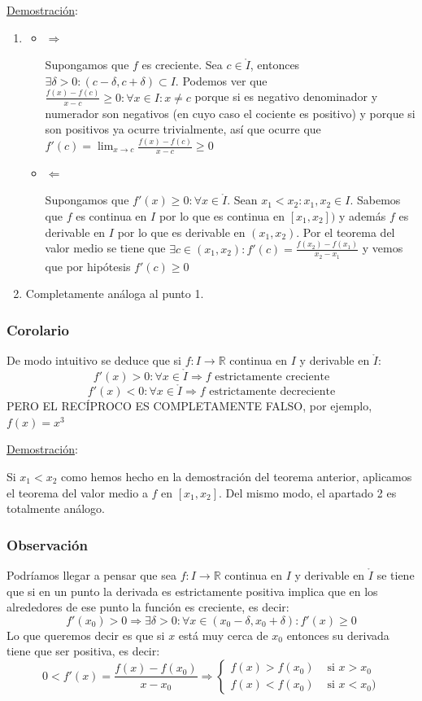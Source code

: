 \documentclass[10pt,a4paper,openright]{book}
\begin{document}
\underline{Demostración}:
\begin{enumerate}
\item
	\begin{itemize}
	\item $\Rightarrow$
	
	Supongamos que $f$ es creciente. Sea $c\in \mathring{I}$, entonces $\exists \delta>0: (c-\delta, c+\delta)\subset I$. Podemos ver que $\frac{f(x)-f(c)}{x-c}\geq 0: \forall x\in I: x\neq c$ porque si es negativo denominador y numerador son negativos (en cuyo caso el cociente es positivo) y porque si son positivos ya ocurre trivialmente, así que ocurre que $f'(c)=\lim_{x\rightarrow c} \frac{f(x)-f(c)}{x-c} \geq 0$
	
	\item $\Leftarrow$
	
	Supongamos que $f'(x)\geq 0: \forall x \in \mathring{I}$. Sean $x_1<x_2: x_1,x_2\in I$. Sabemos que $f$ es continua en $I$ por lo que es continua en $[x_1,x_2])$ y además $f$ es derivable en $I$ por lo que es derivable en $(x_1,x_2)$. Por el teorema del valor medio se tiene que $\exists c\in (x_1,x_2): f'(c)=\frac{f(x_2)-f(x_1)}{x_2-x_1}$ y vemos que por hipótesis $f'(c)\geq 0$	
	\end{itemize}
	
\item Completamente análoga al punto 1.
\end{enumerate}

\subsubsection*{Corolario}
De modo intuitivo se deduce que si $f:I\rightarrow\mathbb R$ continua en $I$ y derivable en $\mathring{I}$:
$$f'(x)>0: \forall x\in \mathring{I}\Rightarrow f\mbox{ estrictamente creciente}$$
$$f'(x)<0: \forall x\in \mathring{I}\Rightarrow f\mbox{ estrictamente decreciente}$$
PERO EL RECÍPROCO ES COMPLETAMENTE FALSO, por ejemplo, $f(x)=x^3$

\underline{Demostración}:

Si $x_1<x_2$ como hemos hecho en la demostración del teorema anterior, aplicamos el teorema del valor medio a $f$ en $[x_1,x_2]$. Del mismo modo, el apartado 2 es totalmente análogo.

\subsubsection*{Observación}
Podríamos llegar a pensar que sea $f:I\rightarrow\mathbb R$ continua en $I$ y derivable en $\mathring{I}$ se tiene que si en un punto la derivada es estrictamente positiva implica que en los alrededores de ese punto la función es creciente, es decir:
$$f'(x_0)>0\Rightarrow \exists \delta>0: \forall x\in (x_0-\delta, x_0+\delta): f'(x)\geq 0$$
Lo que queremos decir es que si $x$ está muy cerca de $x_0$ entonces su derivada tiene que ser positiva, es decir:
$$0<f'(x)=\frac{f(x)-f(x_0)}{x-x_0}\Rightarrow\begin{cases}f(x)>f(x_0) & \mbox{ si }x>x_0\\ f(x)<f(x_0) & \mbox{ si }x<x_0)\end{cases}$$
\end{document}

